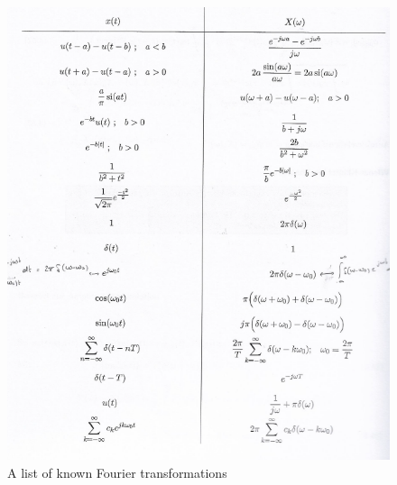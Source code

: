 \documentclass[10pt,a4paper]{article}
\begin{document}
\begin{figure}[H]
\centering
\includegraphics[scale=1]{FourierContIdentities.PNG}
\caption{A list of known Fourier transformations}
\end{figure}

\newpage
\end{document}

